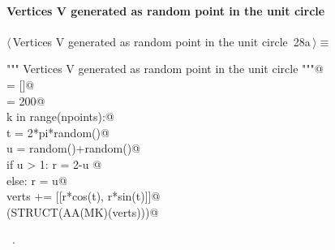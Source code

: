 \documentclass[11pt,oneside]{article}	%
\begin{document}
\paragraph{Vertices V generated as random point in the unit circle}
\begin{flushleft} \small \label{scrap46}
\protect{}$\langle\,$Vertices V generated as random point in the unit circle\nobreak\ {\footnotesize 28a}$\,\rangle\equiv$
\vspace{-1ex}
\begin{list}{}{} \item
\mbox{}\verb@""" Vertices V generated as random point in the unit circle """@\\
\mbox{}\verb@verts = []@\\
\mbox{}\verb@npoints = 200@\\
\mbox{}\verb@for k in range(npoints):@\\
\mbox{}\verb@   t = 2*pi*random()@\\
\mbox{}\verb@   u = random()+random()@\\
\mbox{}\verb@   if u > 1: r = 2-u @\\
\mbox{}\verb@   else: r = u@\\
\mbox{}\verb@   verts += [[r*cos(t), r*sin(t)]]@\\
\mbox{}\verb@VIEW(STRUCT(AA(MK)(verts)))@\\
\mbox{}\verb@@{\NWsep}
\end{list}
\vspace{-1ex}
\footnotesize\addtolength{\baselineskip}{-1ex}
\begin{list}{}{\setlength{\itemsep}{-\parsep}\setlength{\itemindent}{-\leftmargin}}
\item \NWtxtMacroRefIn\ .
\end{list}
\end{flushleft}
\end{document}
